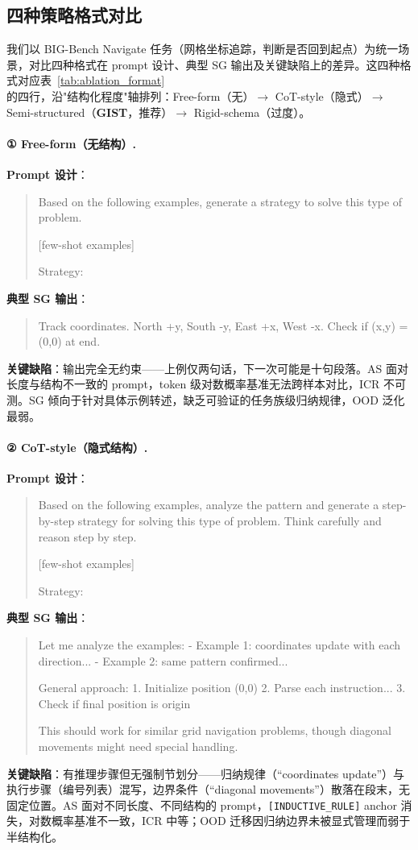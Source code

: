 \documentclass[11pt]{article}
\newcommand{\gist}{\textbf{GIST}}
\newcommand{\mist}{\textbf{GIST}}  %
\newcommand{\sg}{\textnormal{\textsc{SG}}}
\newcommand{\as}{\textnormal{\textsc{AS}}}
\begin{document}
\subsection{四种策略格式对比}
\label{app:four_formats}

我们以 BIG-Bench Navigate 任务（网格坐标追踪，判断是否回到起点）为统一场景，对比四种格式在 prompt 设计、典型 \sg{} 输出及关键缺陷上的差异。这四种格式对应表~\ref{tab:ablation_format} 的四行，沿"结构化程度"轴排列：Free-form（无）$\to$ CoT-style（隐式）$\to$ Semi-structured（\mist{}，推荐）$\to$ Rigid-schema（过度）。

\paragraph{① Free-form（无结构）.}
\textbf{Prompt 设计}：
\begin{quote}\small\ttfamily
Based on the following examples, generate a strategy
to solve this type of problem.

[few-shot examples]

Strategy:
\end{quote}
\noindent\textbf{典型 \sg{} 输出}：
\begin{quote}\small\ttfamily
Track coordinates. North +y, South -y, East +x, West -x.
Check if (x,y) = (0,0) at end.
\end{quote}
\noindent\textbf{关键缺陷}：输出完全无约束——上例仅两句话，下一次可能是十句段落。\as{} 面对长度与结构不一致的 prompt，token 级对数概率基准无法跨样本对比，ICR 不可测。\sg{} 倾向于针对具体示例转述，缺乏可验证的任务族级归纳规律，OOD 泛化最弱。

\paragraph{② CoT-style（隐式结构）.}
\textbf{Prompt 设计}：
\begin{quote}\small\ttfamily
Based on the following examples, analyze the pattern
and generate a step-by-step strategy for solving this
type of problem. Think carefully and reason step by step.

[few-shot examples]

Strategy:
\end{quote}
\noindent\textbf{典型 \sg{} 输出}：
\begin{quote}\small\ttfamily
Let me analyze the examples:
- Example 1: coordinates update with each direction...
- Example 2: same pattern confirmed...

General approach:
1. Initialize position (0,0)
2. Parse each instruction...
3. Check if final position is origin

This should work for similar grid navigation problems,
though diagonal movements might need special handling.
\end{quote}
\noindent\textbf{关键缺陷}：有推理步骤但无强制节划分——归纳规律（``coordinates update''）与执行步骤（编号列表）混写，边界条件（``diagonal movements''）散落在段末，无固定位置。\as{} 面对不同长度、不同结构的 prompt，\texttt{[INDUCTIVE\_RULE]} anchor 消失，对数概率基准不一致，ICR 中等；OOD 迁移因归纳边界未被显式管理而弱于半结构化。
\end{document}
